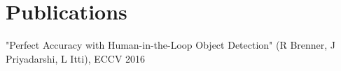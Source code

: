 \newcommand\textlcsc[1]{\textsc{\MakeTextLowercase{#1}}}
\section{Publications}
\begin{itemize}
\setlength\itemsep{-5pt}
"Perfect Accuracy with Human-in-the-Loop Object Detection" (R Brenner, J Priyadarshi, L Itti), ECCV 2016
\end{itemize}

